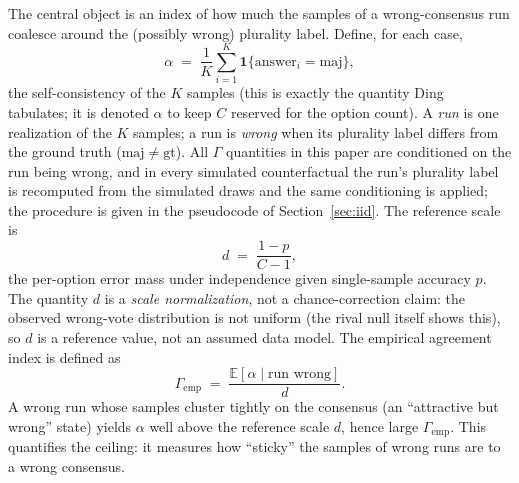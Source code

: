 \documentclass{article}
\newcommand{\agreementIndex}{\Gamma}
\begin{document}
The central object is an index of how much the samples of a
wrong-consensus run coalesce around the (possibly wrong) plurality label.
Define, for
each case,
\[
\alpha \;=\; \frac{1}{K}\sum_{i=1}^{K}
\mathbf{1}\{\text{answer}_i = \mathrm{maj}\},
\]
the self-consistency of the $K$ samples (this is exactly the quantity
Ding~\cite{ding2026auditing} tabulates; it is denoted $\alpha$ to keep
$C$ reserved for the option count). A \emph{run} is one realization of
the $K$ samples; a run is \emph{wrong} when its plurality label differs
from the ground truth ($\mathrm{maj}\ne\mathrm{gt}$). All $\agreementIndex$
quantities in this paper are conditioned on the run being wrong, and in
every simulated counterfactual the run's plurality label is recomputed
from the simulated draws and the same conditioning is applied; the
procedure is given in the pseudocode of
Section~\ref{sec:iid}. The reference scale is
\[
d \;=\; \frac{1-p}{C-1},
\]
the per-option error mass under independence given single-sample
accuracy $p$. The quantity $d$ is a \emph{scale normalization}, not a
chance-correction claim: the observed wrong-vote distribution is not
uniform (the rival null itself shows this), so $d$ is a reference value,
not an assumed data model. The empirical agreement index is defined as
\[
\agreementIndex_{\mathrm{emp}} \;=\; \frac{\mathbb{E}[\alpha \mid \text{run wrong}]}{d}.
\]
A wrong run whose samples cluster tightly on the
consensus (an ``attractive but wrong'' state) yields $\alpha$ well above
the reference scale $d$, hence large $\agreementIndex_{\mathrm{emp}}$. This
quantifies the ceiling: it measures how ``sticky'' the samples of wrong
runs are to a wrong consensus.
\end{document}
